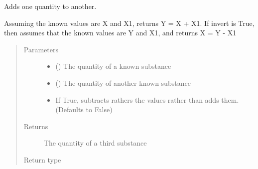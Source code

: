 \documentclass[a4paper,10pt,english]{sphinxmanual}
\begin{document}
\begin{fulllineitems}
\label{\detokenize{calculators:calculators.Addition}}
Adds one quantity to another.

Assuming the known values are X and X1, returns Y = X + X1.
If invert is True, then assumes that the known values are Y and X1, and
returns X = Y - X1
\begin{quote}\begin{description}
\item[{Parameters}] \leavevmode\begin{itemize}
\item {} 
 () \textendash{} The quantity of a known substance

\item {} 
 () \textendash{} The quantity of another known substance

\item {} 
 \textendash{} If True, subtracts rathers the values rather than adds them.
(Defaults to False)

\end{itemize}

\item[{Returns}] \leavevmode
The quantity of a third substance

\item[{Return type}] \leavevmode
{}

\end{description}\end{quote}

\end{fulllineitems}

\end{document}
